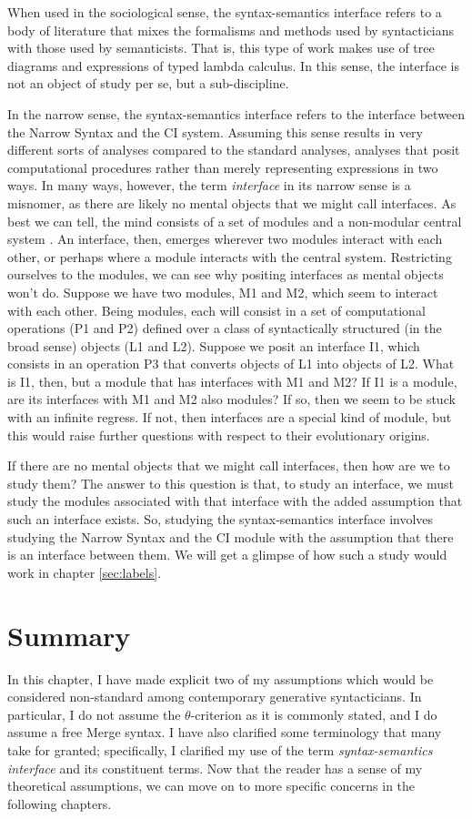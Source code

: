 \documentclass[MilwayThesis]{subfiles}
\begin{document}
When used in the sociological sense, the syntax-semantics interface refers to a body of literature that mixes the formalisms and methods used by syntacticians with those used by semanticists.
That is, this type of work makes use of tree diagrams and expressions of typed lambda calculus.
In this sense, the interface is not an object of study per se, but a sub-discipline.

In the narrow sense, the syntax-semantics interface refers to the interface between the Narrow Syntax and the CI system.
Assuming this sense results in very different sorts of analyses compared to the standard analyses, analyses that posit computational procedures rather than merely representing expressions in two ways.
In many ways, however, the term \textit{interface} in its narrow sense is a misnomer, as there are likely no mental objects that we might call interfaces.
As best we can tell, the mind consists of a set of modules and a non-modular central system \parencite{fodor1983modularity,fodor2001mind}.
An interface, then, emerges wherever two modules interact with each other, or perhaps where a module interacts with the central system.
Restricting ourselves to the modules, we can see why positing interfaces as mental objects won't do.
Suppose we have two modules, M1 and M2, which seem to interact with each other.
Being modules, each will consist in a set of computational operations (P1 and P2) defined over a class of syntactically structured (in the broad sense) objects (L1 and L2).
Suppose we posit an interface I1, which consists in an operation P3 that converts objects of L1 into objects of L2.
What is I1, then, but a module that has interfaces with M1 and M2?
If I1 is a module, are its interfaces with M1 and M2 also modules?
If so, then we seem to be stuck with an infinite regress.
If not, then interfaces are a special kind of module, but this would raise further questions with respect to their evolutionary origins.

If there are no mental objects that we might call interfaces, then how are we to study them?
The answer to this question is that, to study an interface, we must study the modules associated with that interface with the added assumption that such an interface exists.
So, studying the syntax-semantics interface involves studying the Narrow Syntax and the CI module with the assumption that there is an interface between them.
We will get a glimpse of how such a study would work in chapter \ref{sec:labels}.

\section{Summary}
In this chapter, I have made explicit two of my assumptions which would be considered non-standard among contemporary generative syntacticians.
In particular, I do not assume the $\theta$-criterion as it is commonly stated, and I do assume a free Merge syntax.
I have also clarified some terminology that many take for granted; specifically, I clarified my use of the term \textit{syntax-semantics interface} and its constituent terms.
Now that the reader has a sense of my theoretical assumptions, we can move on to more specific concerns in the following chapters.
\end{document}
